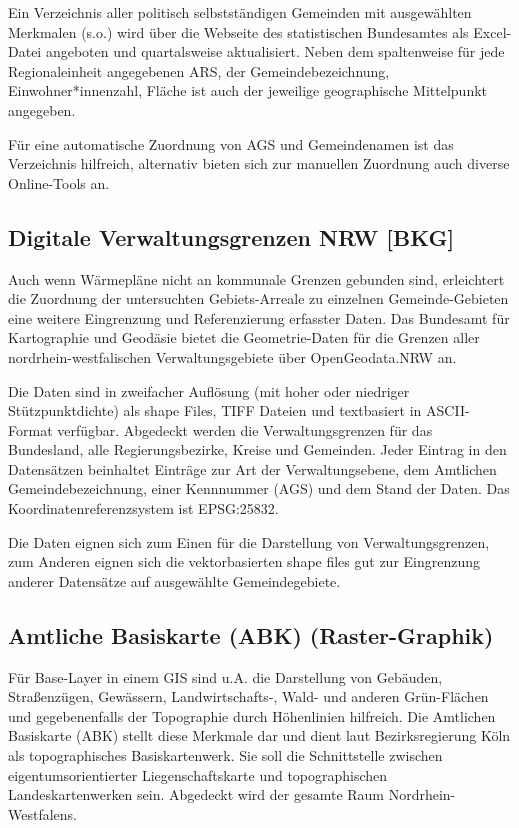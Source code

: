 			Ein Verzeichnis aller politisch selbstständigen Gemeinden mit ausgewählten Merkmalen (s.o.) wird über die Webseite des statistischen Bundesamtes als Excel-Datei angeboten und quartalsweise aktualisiert. Neben dem spaltenweise für jede Regionaleinheit angegebenen ARS, der Gemeindebezeichnung, Einwohner*innenzahl, Fläche ist auch der jeweilige geographische Mittelpunkt angegeben. \cite{web_download_gv_isys_verzeichnis_aller_gemeinden}
			
			Für eine automatische Zuordnung von AGS und Gemeindenamen ist das Verzeichnis hilfreich, alternativ bieten sich zur manuellen Zuordnung auch diverse Online-Tools an. 
		
		\subsection{Digitale Verwaltungsgrenzen NRW [BKG]}
			Auch wenn Wärmepläne nicht an kommunale Grenzen gebunden sind, erleichtert die Zuordnung der untersuchten Gebiets-Arreale zu einzelnen Gemeinde-Gebieten eine weitere Eingrenzung und Referenzierung erfasster Daten. Das Bundesamt für Kartographie und Geodäsie bietet die Geometrie-Daten für die Grenzen aller nordrhein-westfalischen Verwaltungsgebiete über OpenGeodata.NRW an. \cite[s.~/produkte/geobasis/vkg/dvg/]{web_download_opengeodata_nrw}
			
			Die Daten sind in zweifacher Auflösung (mit hoher oder niedriger Stützpunktdichte) als shape Files, TIFF Dateien und textbasiert in ASCII-Format verfügbar. Abgedeckt werden die Verwaltungsgrenzen für das Bundesland, alle Regierungsbezirke, Kreise und Gemeinden. Jeder Eintrag in den Datensätzen beinhaltet Einträge zur Art der Verwaltungsebene, dem Amtlichen Gemeindebezeichnung, einer Kennnummer (AGS) und dem Stand der Daten. Das Koordinatenreferenzsystem ist EPSG:25832.
			
			Die Daten eignen sich zum Einen für die Darstellung von Verwaltungsgrenzen, zum Anderen eignen sich die vektorbasierten shape files gut zur Eingrenzung anderer Datensätze auf ausgewählte Gemeindegebiete.
			
		\subsection{Amtliche Basiskarte (ABK) (Raster-Graphik)}
			Für Base-Layer in einem GIS sind u.A. die Darstellung von Gebäuden, Straßenzügen, Gewässern, Landwirtschafts-, Wald- und anderen Grün-Flächen und gegebenenfalls der Topographie durch Höhenlinien hilfreich. Die Amtlichen Basiskarte (ABK) stellt diese Merkmale dar und dient laut Bezirksregierung Köln als topographisches Basiskartenwerk. Sie soll die Schnittstelle zwischen eigentumsorientierter Liegenschaftskarte und topographischen Landeskartenwerken sein. Abgedeckt wird der gesamte Raum Nordrhein-Westfalens. \cite[s.~/produkte/geobasis/lk/akt/abk\_tiff/]{web_download_opengeodata_nrw}\cite{web_bezreg_koeln_alkis_abk}


